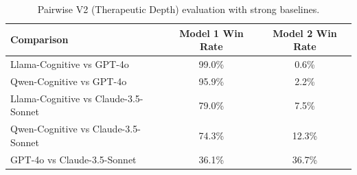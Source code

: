 \begin{table}[t]
\centering
\caption{Pairwise V2 (Therapeutic Depth) evaluation with strong baselines.}
\label{tab:pairwise_baselines}
\begin{tabular}{lcc}
\toprule
Comparison & Model 1 Win Rate & Model 2 Win Rate \\
\midrule
Llama-Cognitive vs GPT-4o & 99.0\% & 0.6\% \\
Qwen-Cognitive vs GPT-4o & 95.9\% & 2.2\% \\
Llama-Cognitive vs Claude-3.5-Sonnet & 79.0\% & 7.5\% \\
Qwen-Cognitive vs Claude-3.5-Sonnet & 74.3\% & 12.3\% \\
GPT-4o vs Claude-3.5-Sonnet & 36.1\% & 36.7\% \\
\bottomrule
\end{tabular}
\end{table}
